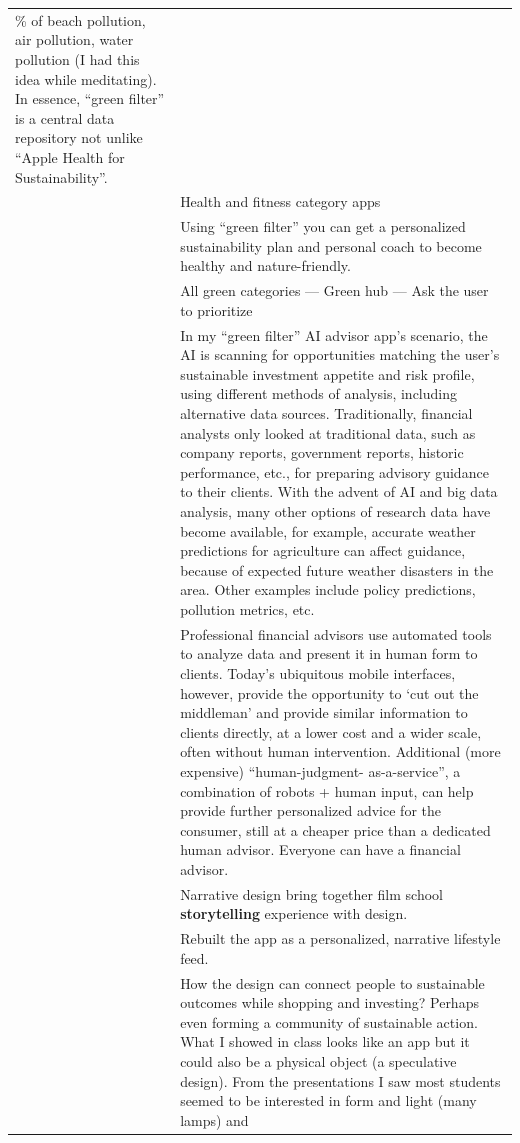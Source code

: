 \documentclass[
  letterpaper,
  DIV=11,
  numbers=noendperiod]{scrartcl}
\begin{document}
\begin{longtable}[]{@{}
  >{\raggedright\arraybackslash}p{}
  >{\raggedright\arraybackslash}p{}@{}}
\% of beach pollution, air pollution, water pollution (I had this idea
while meditating). In essence, ``green filter'' is a central data
repository not unlike ``Apple Health for Sustainability''. \\
& Health and fitness category apps \\
& Using ``green filter'' you can get a personalized sustainability plan
and personal coach to become healthy and nature-friendly. \\
& All green categories --- Green hub --- Ask the user to prioritize \\
& In my ``green filter'' AI advisor app's scenario, the AI is scanning
for opportunities matching the user's sustainable investment appetite
and risk profile, using different methods of analysis, including
alternative data sources. Traditionally, financial analysts only looked
at traditional data, such as company reports, government reports,
historic performance, etc., for preparing advisory guidance to their
clients. With the advent of AI and big data analysis, many other options
of research data have become available, for example, accurate weather
predictions for agriculture can affect guidance, because of expected
future weather disasters in the area. Other examples include policy
predictions, pollution metrics, etc. \\
& Professional financial advisors use automated tools to analyze data
and present it in human form to clients. Today's ubiquitous mobile
interfaces, however, provide the opportunity to `cut out the middleman'
and provide similar information to clients directly, at a lower cost and
a wider scale, often without human intervention. Additional (more
expensive) ``human-judgment- as-a-service'', a combination of robots +
human input, can help provide further personalized advice for the
consumer, still at a cheaper price than a dedicated human advisor.
Everyone can have a financial advisor. \\
& Narrative design bring together film school \textbf{storytelling}
experience with design. \\
& Rebuilt the app as a personalized, narrative lifestyle feed. \\
& How the design can connect people to sustainable outcomes while
shopping and investing? Perhaps even forming a community of sustainable
action. What I showed in class looks like an app but it could also be a
physical object (a speculative design). From the presentations I saw
most students seemed to be interested in form and light (many lamps) and

\end{longtable}
\end{document}
